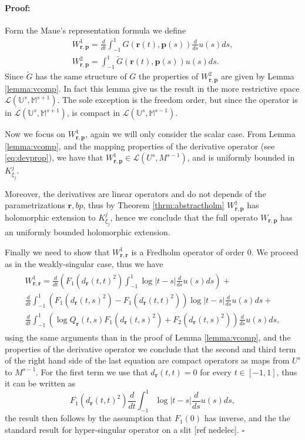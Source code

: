 \documentclass{article}
\newenvironment{proof}{\paragraph{Proof:}}{\hfill$\square$}
\newcommand{\todo}[1]{{\color{red}[#1]}}
\newcommand{\bp}{{\bm p}}
\newcommand{\br}{\bm{r}}
\begin{document}
\begin{proof}
Form the Maue's representation formula we define 
\begin{align*}
W^1_{\br,\bp} = \frac{d}{dt}
 \int_{-1}^1 G(\br(t),\bp(s))\frac{d}{ds}u(s) ds,\\
 W^2_{\br,\bp} = \int_{-1}^1\widetilde{G}(\br(t),\bp(s))u(s)ds.
\end{align*}
Since $\widetilde{G}$ has the same structure of $G$ the properties of $ W^2_{\br,\bp}$ are given by Lemma \ref{lemma:vcomp}. In fact this lemma give us the result in the more restrictive space $\mathcal{L}(\mathbb{U}^s,\mathbb{M}^{s+1})$. The sole exception is the freedom order, but since the operator is in $\mathcal{L}(\mathbb{U}^s,\mathbb{M}^{s+1})$, is compact in $\mathcal{L}(\mathbb{U}^s,\mathbb{M}^{s-1})$.

Now we focus on $W^1_{\br,\bp}$, again we will only consider the scalar case. From Lemma \ref{lemma:vcomp}, and the mapping properties of the derivative operator (see \eqref{eq:devprop}), we have that $W^1_{\br,\bp} \in \mathcal{L}(U^{s},M^{s-1})$, and is uniformly bounded in $K^j_{\xi_j}$.

Moreover, the derivatives are linear operators and do not depends of the parametrizations $\br,bp$, thus by Theorem \ref{thrm:abstractholm} $W^1_{\br,\bp}$ has holomorphic extension to $K^j_{\xi_j}$, hence we conclude that the full operato $W_{\br,\bp}$ has an uniformly bounded holomorphic extension. 

Finally we need to show that $W^1_{\br,\br}$ is a Fredholm operator of order 0. We proceed as in the weakly-singular case, thus we have 
\begin{align*}
\begin{split}
W^1_{\br,\br} = \frac{d}{dt}\left( F_1 (d_{\br}(t,t)^2)
\int_{-1}^1 \log|t-s| \frac{d}{ds}u(s)ds\right) +\\
\frac{d}{dt}\int_{-1}^1(F_1 (d_{\br}(t,s)^2)-F_1 (d_{\br}(t,t)^2)) \log|t-s| \frac{d}{ds}u(s)ds+\\
\frac{d}{dt} \int_{-1}^1 \left(\log Q_{\br}(t,s)F_1(d_{\br}(t,s)^2)+F_2(d_{\br}(t,s)^2) \right)\frac{d}{ds}u(s)ds,
\end{split}
\end{align*}
using the same arguments than in the proof of Lemma \ref{lemma:vcomp}, and the properties of the derivative operator we conclude that the second and third term of the right hand side of the last equation are compact operators as maps from $U^s$ to $M^{s-1}$. For the first term we use that $d_{\br}(t,t) = 0$ for every $t \in [-1,1]$, thus it can be written as 
$$
 F_1 (d_{\br}(t,t)^2)\frac{d}{dt}
\int_{-1}^1 \log|t-s| \frac{d}{ds}u(s)ds,
$$
the result then follows by the assumption that $F_1(0)$ has inverse, and the the standard result for hyper-singular operator on a slit \todo{ref nedelec}. 
\end{proof}
\end{document}

